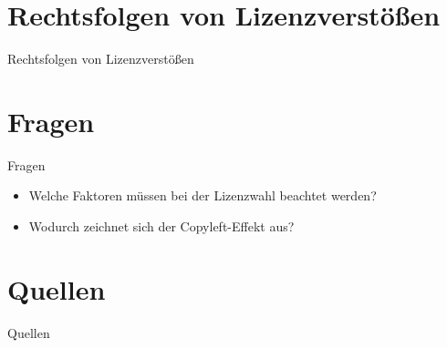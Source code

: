 \documentclass{beamer}
\begin{document}
\section{Rechtsfolgen von Lizenzverstößen}
\begin{frame}{Rechtsfolgen von Lizenzverstößen}
\end{frame}

\section{Fragen}
\begin{frame}{Fragen}
	\begin{itemize}
		\item Welche Faktoren müssen bei der Lizenzwahl beachtet werden?
		\item Wodurch zeichnet sich der Copyleft-Effekt aus? %
	\end{itemize}
\end{frame}

\section{Quellen}
\begin{frame}{Quellen}



\end{frame}



\end{document}
